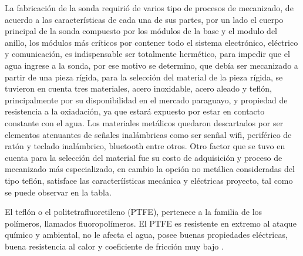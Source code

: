 La fabricaci\'on de la sonda requiri\'o de varios tipo de procesos de mecanizado, de acuerdo a las caracter\'isticas de cada una de sus partes, por un lado el cuerpo principal de la sonda compuesto por los m\'odulos de la base y el modulo del anillo, los m\'odulos más cr\'iticos por contener todo el sistema electr\'onico, el\'ectrico y comunicaci\'on, es indispensable ser totalmente herm\'etico, para impedir que el agua ingrese a la sonda, por ese motivo se determino, que deb\'ia ser mecanizado a partir de una pieza r\'igida, para la selecci\'on del material de la pieza rígida, se tuvieron en cuenta tres materiales, acero inoxidable, acero aleado y tefl\'on, principalmente por su disponibilidad en el mercado paraguayo, y propiedad de resistencia a la oxiadaci\'on, ya que estar\'a expuesto por estar en contacto constante con el agua. 
Los materiales met\'alicos quedaron descartados por ser elementos atenuantes de se\~nales inal\'ambricas como ser sen\~nal wifi, perif\'erico de rat\'on y teclado inal\'ambrico, bluetooth entre otros. Otro factor que se tuvo en cuenta para la selecci\'on del material fue su costo de adquisici\'on  y proceso de mecanizado m\'as especializado, en cambio la opción no met\'alica consideradas del tipo tefl\'on, satisface las caracterí\'isticas mec\'anica y el\'ectricas proyecto, tal como se puede observar en la tabla. 

El tefl\'on o el politetrafluoretileno (PTFE), pertenece a la familia de los pol\'imeros, llamados fluoropol\'imeros. El PTFE es resistente en extremo al ataque qu\'imico y ambiental, no le afecta el agua, posee buenas propiedades el\'ectricas, buena resistencia al calor y coeficiente de fricci\'on muy bajo \cite{groover_fundamentos_1997}.

